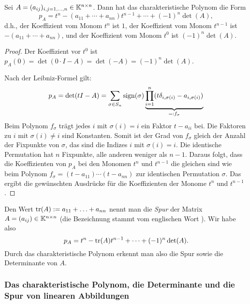 \begin{propn}
	Sei $ A = (a_{ij})_{i,j=1,\ldots,n} \in \mathbb K^{n \times n} $. Dann hat das charakteristische Polynom die Form 
	\[
		p_A = t^n - (a_{11} + \cdots + a_{nn}) t^{n-1} + \cdots + (-1)^n \det(A),
	\]
	d.h., der Koeffizient vom Monom $t^n$ ist $1$, der Koeffizient vom Monom $t^{n-1}$ ist $- (a_{11} + \cdots + a_{nn})$, und der Koeffizient vom Monom $t^0$ ist $(-1)^n \det(A)$. 
\end{propn}
\begin{proof}
	Der Koeffizient vor $ t^0 $ ist $ p_A(0) = \det(0 \cdot I - A) = \det(-A) = (-1)^n \det(A) $. 
	
	Nach der Leibniz-Formel gilt:
	\begin{equation*}
		p_A = \det(tI-A) = \sum_{\sigma \in S_n} \operatorname{sign}(\sigma) \underbrace{\prod_{i=1}^n (t \delta_{i,\sigma(i)} - a_{i,\sigma(i)})}_{=:f_\sigma}
	\end{equation*}
	Beim Polynom $f_\sigma$ trägt jedes $i$ mit $\sigma(i)=i$ ein Faktor $t - a_{ii}$ bei. Die Faktoren zu $i$ mit $\sigma(i) \ne i$ sind Konstanten. Somit ist der Grad von $f_\sigma$ gleich der Anzahl der Fixpunkte von $\sigma$, das sind die Indizes $i$ mit $\sigma(i) =i$. Die identische Permutation hat $n$ Fixpunkte, alle anderen weniger als $n-1$. Daraus folgt, dass die Koeffizienten von $p_A$ bei den Monomen $t^n$ und $t^{n-1}$ die gleichen sind wie beim Polynom $f_{\sigma} = (t -a_{11}) \cdots (t - a_{nn})$ zur identischen Permutation $\sigma$. Das ergibt die gewünschten Ausdrücke für die Koeffizienten der Monome $t^n$ und $t^{n-1}$. 
\end{proof}

\noindent Den Wert $\operatorname{tr}(A):= a_{11} + \ldots + a_{nn} $ nennt man die \emph{Spur} der Matrix $ A = (a_{ij}) \in \mathbb K^{n \times n} $  (die Bezeichnung stammt vom englischen Wort ). Wir habe also 
\[
	p_A = t^n - \operatorname{tr}(A) t^{n-1} + \cdots + (-1)^n \det(A). 
\]
Durch das charakteristische Polynom erkennt man also die Spur sowie die Determinante von $A$. 

\subsubsection{Das charakteristische Polynom, die Determinante und die Spur von linearen Abbildungen}


